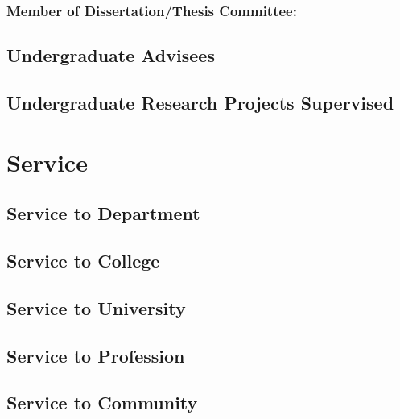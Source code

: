 \documentclass[10pt]{article}
\begin{document}
    \subsubsection{Member of Dissertation/Thesis Committee:}
    \begin{enumerate}
    	
	\end{enumerate}
	\subsection{Undergraduate Advisees}
	\begin{enumerate}
		
	\end{enumerate}
	\subsection{Undergraduate Research Projects Supervised}
	\begin{enumerate}
		
	\end{enumerate}
\fi

\section{Service}
\iftrue
	\subsection{Service to Department}
    	\begin{description}
    		
    	\end{description}

	\subsection{Service to College}
    	\begin{description}
    		
    	\end{description}

	\subsection{Service to University}
    	\begin{description}
    		
    	\end{description}
\fi
	\subsection{Service to Profession}
    	\begin{description}
    		
        \end{description}
	\subsection{Service to Community}
    	\begin{description}
    		
        \end{description}
\end{document}
